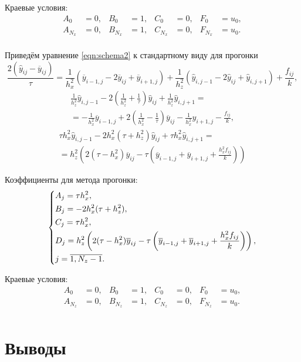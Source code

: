 Краевые условия:
\begin{equation}
	\begin{aligned}
		A_0     &= 0, & B_0     &= 1, & C_0     &= 0, & F_0     &= u_0, \\
		A_{N_x} &= 0, & B_{N_x} &= 1, & C_{N_x} &= 0, & F_{N_x} &= u_0. \\
	\end{aligned}
\end{equation}


Приведём уравнение \eqref{eqn:schema2} к стандартному виду для прогонки
\begin{equation}
	\frac{2(\hat y_{ij} - \overline y_{ij})}{\tau} = \frac{1}{h_x^2} (\overline y_{i - 1, j} - 2\overline y_{ij} + \overline y_{i + 1, j}) + \frac{1}{h_z^2} (\hat y_{i, j - 1} - 2\hat y_{ij} + \hat y_{i, j + 1}) + \frac{f_{ij}}k,
\end{equation}
\begin{multline*}
	\frac1{h_z^2} \hat y_{i, j - 1} - 2 \left(\frac1{h_z^2} + \frac1\tau \right)\hat y_{ij} + \frac1{h_z^2}\hat y_{i, j + 1} = \\
	= -\frac1{h_x^2}\overline y_{i - 1, j} + 2\left(\frac1{h_x^2} - \frac1\tau\right)\overline y_{ij} - \frac1{h_x^2}y_{i + 1, j} - \frac{f_{ij}}k,
\end{multline*}
\begin{multline*}
	\tau h_x^2 \hat y_{i, j - 1} - 2h_x^2(\tau + h_z^2)\hat y_{ij} + \tau h_x^2 \hat y_{i, j + 1} = \\
	= h_z^2 \left( 2(\tau - h_x^2)\overline y_{ij} - \tau \left( \overline y_{i - 1, j} + \overline y_{i + 1, j} + \frac{h_x^2 f_{ij}}k \right) \right)
\end{multline*}

Коэффициенты для метода прогонки:
\begin{equation}
	\begin{dcases}
		A_j = \tau h_x^2, \\
		B_j = -2h_x^2(\tau + h_z^2), \\
		C_j = \tau h_x^2, \\
		D_j = h_z^2 \left( 2(\tau - h_x^2)\overline y_{ij} - \tau \left( \overline y_{i - 1, j} + \overline y_{i + 1, j} + \frac{h_x^2 f_{ij}}k \right) \right), \\
		j = \overline{1, N_z - 1}. \\
	\end{dcases}
\end{equation}

Краевые условия:
\begin{equation}
	\begin{aligned}
		A_0     &= 0, & B_0     &= 1, & C_0     &= 0, & F_0     &= u_0, \\
		A_{N_z} &= 0, & B_{N_z} &= 1, & C_{N_z} &= 0, & F_{N_z} &= u_0. \\
	\end{aligned}
\end{equation}


\section{Выводы}
